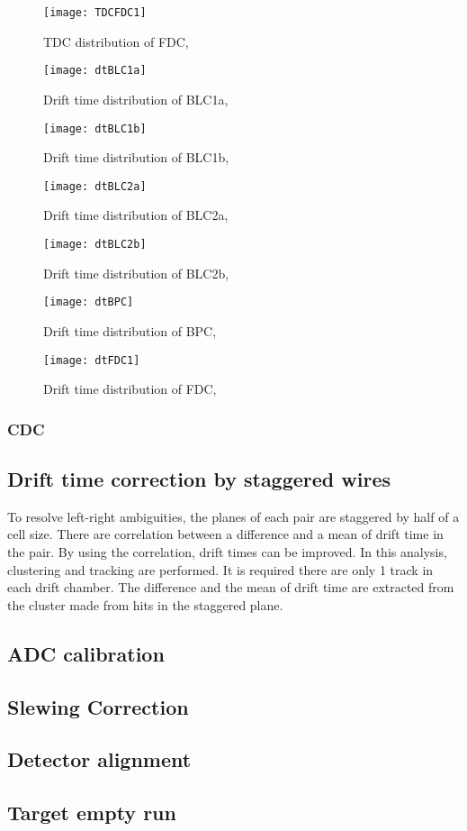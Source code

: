 \begin{figure}
\texttt{[image: TDCFDC1]}
\caption{TDC distribution of FDC, }
\label{fig:TDCFDC1}
\end{figure}

\begin{figure}
\texttt{[image: dtBLC1a]}
\caption{Drift time distribution of BLC1a, }
\label{fig:dtBLC1a}
\end{figure}

\begin{figure}
\texttt{[image: dtBLC1b]}
\caption{Drift time distribution of BLC1b, }
\label{fig:dtBLC1b}
\end{figure}

\begin{figure}
\texttt{[image: dtBLC2a]}
\caption{Drift time distribution of BLC2a, }
\label{fig:dtBLC2a}
\end{figure}

\begin{figure}
\texttt{[image: dtBLC2b]}
\caption{Drift time distribution of BLC2b, }
\label{fig:dtBLC2b}
\end{figure}

\begin{figure}
\texttt{[image: dtBPC]}
\caption{Drift time distribution of BPC, }
\label{fig:dtBPC}
\end{figure}

\begin{figure}
\texttt{[image: dtFDC1]}
\caption{Drift time distribution of FDC, }
\label{fig:dtFDC1}
\end{figure}




\subsubsection{CDC}

\subsection{Drift time correction by staggered wires}
To resolve left-right ambiguities, the planes of each pair are staggered by half of a cell size. There are correlation between a difference and a mean of drift time in the pair. By using the correlation, drift times can be improved.
In this analysis, clustering and tracking are performed.  It is required there are only 1 track in each drift chamber. The difference and the mean of drift time are extracted from the cluster made from hits in the staggered plane. 

\subsection{ADC calibration}

\subsection{Slewing Correction}

\subsection{Detector alignment}


\subsection{Target empty run}
